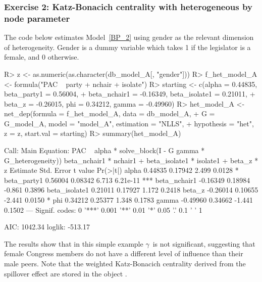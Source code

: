 \documentclass[nojss]{jss}
\begin{document}
\subsubsection{Exercise 2: Katz-Bonacich centrality with heterogeneous by
node parameter}

The code below estimates Model~\ref{BP_2} using gender as the relevant
dimension of heterogeneity.  Gender is a dummy variable which takes 1 if the
legislator is a female, and 0 otherwise.
%
\begin{CodeChunk}
\begin{CodeInput}
R> z <- as.numeric(as.character(db_model_A[, "gender"]))
R> f_het_model_A <- formula("PAC ~ party + nchair + isolate")
R> starting <- c(alpha = 0.44835, beta_party1 = 0.56004,
+    beta_nchair1 = -0.16349, beta_isolate1 = 0.21011,
+    beta_z = -0.26015, phi = 0.34212, gamma = -0.49960)
R> het_model_A <- net_dep(formula = f_het_model_A, data = db_model_A,
+    G = G_model_A, model = "model_A", estimation = "NLLS",
+    hypothesis = "het", z = z, start.val = starting)
R> summary(het_model_A)
\end{CodeInput}
\begin{CodeOutput}
Call:
Main Equation:  PAC ~ alpha * solve_block(I - G %
gamma * G_heterogeneity)) %
beta_nchair1 * nchair1 + beta_isolate1 * isolate1 + beta_z * z
              Estimate Std. Error t value Pr(>|t|)    
alpha          0.44835    0.17942   2.499   0.0128 *  
beta_party1    0.56004    0.08342   6.713 6.21e-11 ***
beta_nchair1  -0.16349    0.18984  -0.861   0.3896    
beta_isolate1  0.21011    0.17927   1.172   0.2418    
beta_z        -0.26014    0.10655  -2.441   0.0150 *  
phi            0.34212    0.25377   1.348   0.1783    
gamma         -0.49960    0.34662  -1.441   0.1502    
---
Signif. codes:  0 '***' 0.001 '**' 0.01 '*' 0.05 '.' 0.1 ' ' 1

AIC: 1042.34  loglik: -513.17
\end{CodeOutput}
\end{CodeChunk}
%
The results show that in this simple example $\gamma$\ is not significant,
suggesting that female Congress members do not have a different level of
influence than their male peers.  Note that the weighted Katz-Bonacich
centrality derived from the spillover effect are stored in the object
.
\end{document}
